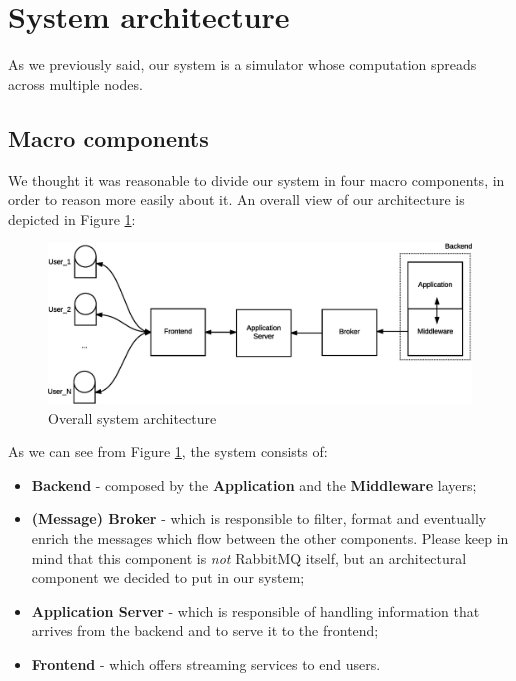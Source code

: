 \section{System architecture}
As we previously said, our system is a simulator whose computation spreads
across multiple nodes.

\subsection{Macro components}

We thought it was reasonable to divide our system in four macro components,
in order to reason more easily about it. An overall view of our architecture
is depicted in Figure \ref{fig:sd-sys-arch-overall}:

\begin{figure}[H]
  \centering
  \includegraphics[scale=0.5,keepaspectratio]
    {images/solution/overall-arch.eps}
  \caption{Overall system architecture}
  \label{fig:sd-sys-arch-overall}
\end{figure}

As we can see from Figure \ref{fig:sd-sys-arch-overall}, the system consists of:

\begin{itemize}
  \item \textbf{Backend} - composed by the \textbf{Application} and the
    \textbf{Middleware} layers;
  \item \textbf{(Message) Broker} - which is responsible to filter, format
    and eventually enrich the messages which flow between the other components.
    Please keep in mind that this component is \textit{not} RabbitMQ itself,
    but an architectural component we decided to put in our system;
  \item \textbf{Application Server} - which is responsible of handling
    information that arrives from the backend and to serve it to the frontend;
  \item \textbf{Frontend} - which offers streaming services to end users.
\end{itemize}

